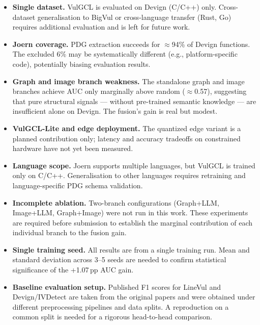 \begin{itemize}
  \item \textbf{Single dataset.} VulGCL is evaluated on Devign (C/C++) only.
    Cross-dataset generalisation to BigVul or cross-language transfer (Rust, Go)
    requires additional evaluation and is left for future work.

  \item \textbf{Joern coverage.} PDG extraction succeeds for $\approx$94\% of
    Devign functions. The excluded 6\% may be systematically different
    (e.g., platform-specific code), potentially biasing evaluation results.

  \item \textbf{Graph and image branch weakness.} The standalone graph and image
    branches achieve AUC only marginally above random ($\approx$0.57), suggesting
    that pure structural signals — without pre-trained semantic knowledge — are
    insufficient alone on Devign. The fusion's gain is real but modest.

  \item \textbf{VulGCL-Lite and edge deployment.} The quantized edge variant is a
    planned contribution only; latency and accuracy tradeoffs on constrained
    hardware have not yet been measured.

  \item \textbf{Language scope.} Joern supports multiple languages, but VulGCL is
    trained only on C/C++. Generalisation to other languages requires retraining
    and language-specific PDG schema validation.

  \item \textbf{Incomplete ablation.} Two-branch configurations (Graph+LLM,
    Image+LLM, Graph+Image) were not run in this work. These experiments are
    required before submission to establish the marginal contribution of each
    individual branch to the fusion gain.

  \item \textbf{Single training seed.} All results are from a single training run.
    Mean and standard deviation across 3–5 seeds are needed to confirm statistical
    significance of the +1.07\,pp AUC gain.

  \item \textbf{Baseline evaluation setup.} Published F1 scores for LineVul and
    Devign/IVDetect are taken from the original papers and were obtained under
    different preprocessing pipelines and data splits. A reproduction on a common
    split is needed for a rigorous head-to-head comparison.
\end{itemize}

